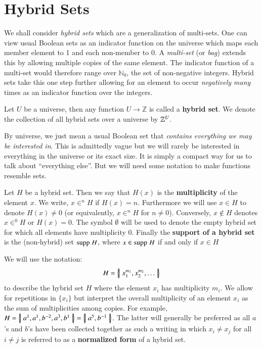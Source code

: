 %
%
\section{Hybrid Sets}




We shall consider \emph{hybrid sets} which are a generalization of multi-sets.
One can view usual Boolean sets as an indicator function on the universe
which maps each member element to 1 and each non-member to 0.
A \emph{multi-set} (or \emph{bag}) extends this by allowing multiple copies of the same element.
The indicator function of a multi-set would therefore range over $\mathbb{N}_0$, the set of non-negative integers.
Hybrid sets take this one step further allowing for an element to occur \emph{negatively many} times 
as an indicator function over the integers.


\begin{definition}
	Let $U$ be a universe, then any function $U \to \mathbb{Z}$ is called a \textbf{hybrid set}.
	We denote the collection of all hybrid sets over a universe by $\hsetover[U]$.
\end{definition}


By universe, we just mean a usual Boolean set that \emph{contains everything we may be interested in}.
This is admittedly vague but we will rarely be interested in everything in the universe or its exact size.
It is simply a compact way for us to talk about ``everything else''.
But we will need some notation to make functions resemble sets.


\begin{definition}
	Let $H$ be a hybrid set. 
	Then we say that $H(x)$ is the \textbf{multiplicity} of the element $x$. 
	We write, $x \in^n H$ if $H(x)=n$. 
	Furthermore we will use $x \in H$ to denote $H(x)\neq 0$ (or equivalently, $x \in^n H$ for $n\neq 0$).
	Conversely, $x \notin H$ denotes $x \in^0 H$ or $H(x)=0$.
	The symbol $\emptyset$ will be used to denote the empty hybrid set for which all elements have multiplicity 0.
	Finally the \textbf{support of a hybrid set} is the (non-hybrid) set $\text{supp}\;H$,
	where $x \in \text{supp}\;H$ if and only if $x \in H$
\end{definition}


We will use the notation:
\begin{equation*}
	H = \left\{ \! \left| \; x_1^{m_1}, x_2^{m_2},\ldots \; \right| \! \right\}
\end{equation*}
to describe the hybrid set $H$ where the element $x_i$ has multiplicity $m_i$. 
We allow for repetitions in $\{ x_i \}$ but interpret the overall multiplicity of an element $x_i$ as 
the sum of multiplicities among copies. 
For example, $H=\left\{ \! \left| \; a^1, a^1, b^{-2}, a^3, b^1 \; \right| \! \right\} = \left\{ \! \left| \; a^5, b^{-1} \; \right| \! \right\}$. 
The latter will generally be preferred as all $a$'s and $b$'s have been collected together as such
a writing in which $x_i \neq x_j$ for all $i \neq j$ is referred to as a \textbf{normalized form} of a hybrid set. 


